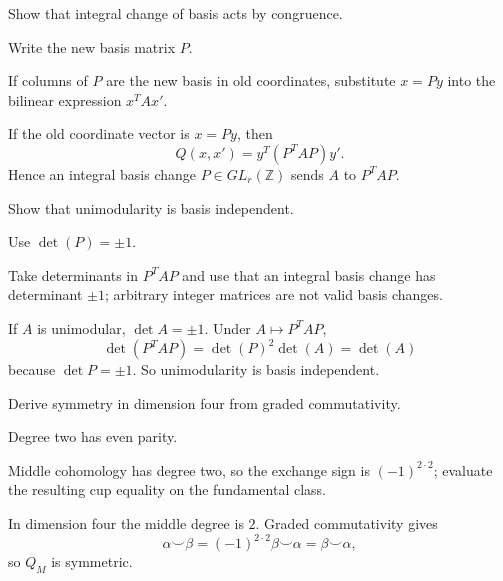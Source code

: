 \begin{exercise}\label{exr:viii34-13}
Show that integral change of basis acts by congruence.
\end{exercise}
\begin{hint}
Write the new basis matrix $P$.

If columns of \(P\) are the new basis in old coordinates, substitute \(x=Py\) into the bilinear expression \(x^TAx'\).
\end{hint}
\begin{solution}
If the old coordinate vector is \(x=Py\), then
\[
Q(x,x')=y^T(P^TAP)y'.
\]
Hence an integral basis change \(P\in GL_r(\mathbb Z)\) sends \(A\) to \(P^TAP\).
\end{solution}

\begin{exercise}\label{exr:viii34-14}
Show that unimodularity is basis independent.
\end{exercise}
\begin{hint}
Use $\det(P)=\pm1$.

Take determinants in \(P^TAP\) and use that an integral basis change has determinant \(\pm1\); arbitrary integer matrices are not valid basis changes.
\end{hint}
\begin{solution}
If \(A\) is unimodular, \(\det A=\pm1\). Under \(A\mapsto P^TAP\),
\[
\det(P^TAP)=\det(P)^2\det(A)=\det(A)
\]
because \(\det P=\pm1\). So unimodularity is basis independent.
\end{solution}

\begin{exercise}\label{exr:viii34-15}
Derive symmetry in dimension four from graded commutativity.
\end{exercise}
\begin{hint}
Degree two has even parity.

Middle cohomology has degree two, so the exchange sign is \((-1)^{2\cdot2}\); evaluate the resulting cup equality on the fundamental class.
\end{hint}
\begin{solution}
In dimension four the middle degree is \(2\). Graded commutativity gives
\[
\alpha\smile\beta=(-1)^{2\cdot2}\beta\smile\alpha=\beta\smile\alpha,
\]
so \(Q_M\) is symmetric.
\end{solution}

